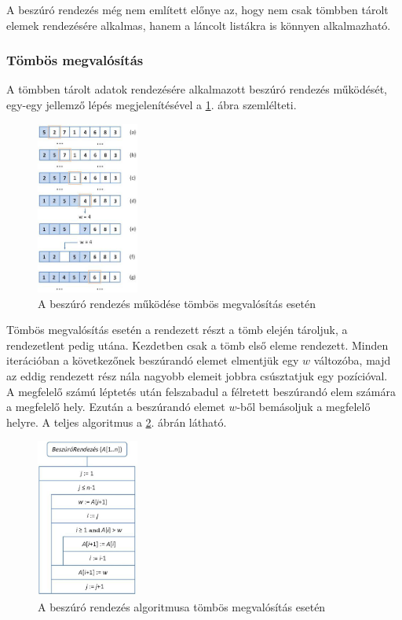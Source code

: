 \documentclass[12pt,margin=0px]{article}
\begin{document}
    A beszúró rendezés még nem említett előnye az, hogy nem csak tömbben tárolt elemek rendezésére alkalmas, hanem a láncolt listákra is könnyen alkalmazható.

    \subsubsection*{Tömbös megvalósítás}

    A tömbben tárolt adatok rendezésére alkalmazott beszúró rendezés működését, egy-egy jellemző lépés megjelenítésével a \ref{fig:insertsort_sample}. ábra szemlélteti.

	\begin{figure}[H]
		\centering
		\includegraphics[width=0.3\textwidth]{img/insertsort_sample}
		\caption{A beszúró rendezés működése tömbös megvalósítás esetén}
        \label{fig:insertsort_sample}
	\end{figure}

    Tömbös megvalósítás esetén a rendezett részt a tömb elején tároljuk, a rendezetlent pedig utána. Kezdetben csak a tömb első eleme rendezett. Minden iterációban a következőnek beszúrandó elemet elmentjük egy $w$ változóba, majd az eddig rendezett rész nála nagyobb elemeit jobbra csúsztatjuk egy pozícióval.\\

    A megfelelő számú léptetés után felszabadul a félretett beszúrandó elem számára a megfelelő hely. Ezután a beszúrandó elemet $w$-ből bemásoljuk a megfelelő helyre. A teljes algoritmus a \ref{fig:insertsort}. ábrán látható.

	\begin{figure}[H]
		\centering
		\includegraphics[width=0.3\textwidth]{img/insertionsort.png}
		\caption{A beszúró rendezés algoritmusa tömbös megvalósítás esetén}
        \label{fig:insertsort}
	\end{figure}
	
\end{document}
